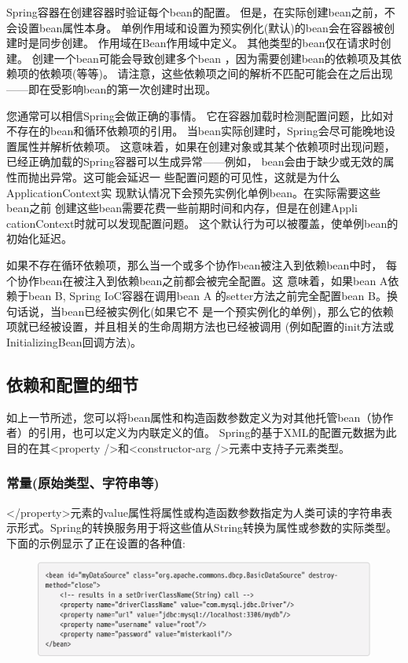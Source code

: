 Spring容器在创建容器时验证每个bean的配置。
但是，在实际创建bean之前，不会设置bean属性本身。
单例作用域和设置为预实例化(默认)的bean会在容器被创建时是同步创建。
作用域在Bean作用域中定义。
其他类型的bean仅在请求时创建。
创建一个bean可能会导致创建多个bean
，因为需要创建bean的依赖项及其依赖项的依赖项(等等)。
请注意，这些依赖项之间的解析不匹配可能会在之后出现——即在受影响bean的第一次创建时出现。

您通常可以相信Spring会做正确的事情。
它在容器加载时检测配置问题，比如对不存在的bean和循环依赖项的引用。
当bean实际创建时，Spring会尽可能晚地设置属性并解析依赖项。
这意味着，如果在创建对象或其某个依赖项时出现问题，已经正确加载的Spring容器可以生成异常——例如，
bean会由于缺少或无效的属性而抛出异常。这可能会延迟一
些配置问题的可见性，这就是为什么ApplicationContext实
现默认情况下会预先实例化单例bean。在实际需要这些bean之前
创建这些bean需要花费一些前期时间和内存，但是在创建Appli
cationContext时就可以发现配置问题。
这个默认行为可以被覆盖，使单例bean的初始化延迟。

如果不存在循环依赖项，那么当一个或多个协作bean被注入到依赖bean中时，
每个协作bean在被注入到依赖bean之前都会被完全配置。这
意味着，如果bean A依赖于bean B, Spring IoC容器在调用bean A
的setter方法之前完全配置bean B。换句话说，当bean已经被实例化(如果它不
是一个预实例化的单例)，那么它的依赖项就已经被设置，并且相关的生命周期方法也已经被调用
(例如配置的init方法或InitializingBean回调方法)。

\subsection{依赖和配置的细节}
如上一节所述，您可以将bean属性和构造函数参数定义为对其他托管bean（协作者）的引用，也可以定义为内联定义的值。 Spring的基于XML的配置元数据为此目的在其<property />和<constructor-arg />元素中支持子元素类型。

\subsubsection{常量(原始类型、字符串等)}

</property>元素的value属性将属性或构造函数参数指定为人类可读的字符串表示形式。Spring的转换服务用于将这些值从String转换为属性或参数的实际类型。下面的示例显示了正在设置的各种值:

\begin{figure}[ht]
    \centering
    \includegraphics[width=1\linewidth]{./Figure/IMG_code_32.png}
\end{figure}

